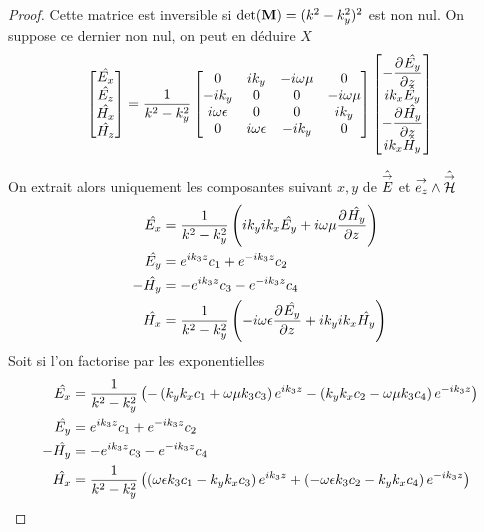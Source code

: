 \begin{proof}
            Cette matrice est inversible si \(\det(\mM) = (k^2 - k_y^2)^2 \) est non nul.
            On suppose ce dernier non nul, on peut en déduire \(X\)
            \begin{equation}
              \begin{bmatrix}
                \hat{E_x}\\
                \hat{E_z}\\
                \hat{H_x}\\
                \hat{H_z}
              \end{bmatrix} =
              \frac{1}{k^2 - k_y^2}
              \begin{bmatrix}
              0 & ik_y & -i\w\mu & 0
              \\
              -ik_y & 0 & 0 & -i\w\mu
              \\
              i\w\eps & 0 & 0 & ik_y
              \\
              0 & i\w\eps & -ik_y & 0
              \end{bmatrix}
              \begin{bmatrix}
                -\ddr{z}{\hat{E_y}}\\
                ik_x\hat{E_y}\\
                -\ddr{z}{\hat{H_y}}\\
                ik_x\hat{H_y}
              \end{bmatrix}
            \end{equation}

            On extrait alors uniquement les composantes suivant \(x,y\) de \(\hat{\vE}\) et \(\vect{e_z} \pvect \hat{\vH}\)
            \begin{align}
                \hat{E_x} &= \frac{1}{k^2 - k_y^2}\left(ik_yik_x\hat{E_y} + i\w\mu\ddr{z}{\hat{H_y}}\right)
                \\
                \hat{E_y} &= e^{ik_3z}c_1 + e^{-ik_3z}c_2
                \\
                -\hat{H_y} &= -e^{ik_3z}c_3 - e^{-ik_3z}c_4
                \\
                \hat{H_x} &= \frac{1}{k^2 - k_y^2}\left(-i\w\eps\ddr{z}{\hat{E_y}} + ik_yik_x\hat{H_y}\right)
            \end{align}
            Soit si l'on factorise par les exponentielles
            \begin{align}
                \hat{E_x} &= \frac{1}{k^2 - k_y^2}\left(-\left(k_yk_x c_1 + \w\mu k_3 c_3 \right)e^{ik_3z} - \left(k_yk_xc_2 - \w\mu k_3 c_4\right)e^{-ik_3z}\right)
                \\
                \hat{E_y} &= e^{ik_3z}c_1 + e^{-ik_3z}c_2
                \\
                -\hat{H_y} &= -e^{ik_3z}c_3 - e^{-ik_3z}c_4
                \\
                \hat{H_x} &= \frac{1}{k^2 - k_y^2}\left(\left(\w\eps k_3c_1 - k_y k_x c_3\right)e^{ik_3z} + \left(-\w\eps k_3c_2 - k_y k_x c_4\right)e^{-ik_3z}\right)
            \end{align}


\end{proof}
